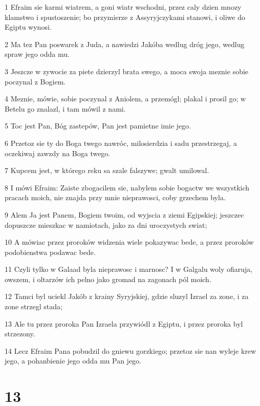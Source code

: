 \par 1 Efraim sie karmi wiatrem, a goni wiatr wschodni, przez caly dzien mnozy klamstwo i spustoszenie; bo przymierze z Assyryjczykami stanowi, i oliwe do Egiptu wynosi.
\par 2 Ma tez Pan poswarek z Juda, a nawiedzi Jakóba wedlug dróg jego, wedlug spraw jego odda mu.
\par 3 Jeszcze w zywocie za piete dzierzyl brata swego, a moca swoja meznie sobie poczynal z Bogiem.
\par 4 Meznie, mówie, sobie poczynal z Aniolem, a przemógl; plakal i prosil go; w Betelu go znalazl, i tam mówil z nami.
\par 5 Toc jest Pan, Bóg zastepów, Pan jest pamietne imie jego.
\par 6 Przetoz sie ty do Boga twego nawróc, milosierdzia i sadu przestrzegaj, a oczekiwaj zawzdy na Boga twego.
\par 7 Kupcem jest, w którego reku sa szale falszywe; gwalt umilowal.
\par 8 I mówi Efraim: Zaiste zbogacilem sie, nabylem sobie bogactw we wszystkich pracach moich, nie znajda przy mnie nieprawosci, coby grzechem byla.
\par 9 Alem Ja jest Panem, Bogiem twoim, od wyjscia z ziemi Egipskiej; jeszczec dopuszcze mieszkac w namiotach, jako za dni uroczystych swiat;
\par 10 A mówiac przez proroków widzenia wiele pokazywac bede, a przez proroków podobienstwa podawac bede.
\par 11 Czyli tylko w Galaad byla nieprawosc i marnosc? I w Galgalu woly ofiaruja, owszem, i oltarzów ich pelno jako gromad na zagonach pól moich.
\par 12 Tamci byl uciekl Jakób z krainy Syryjskiej, gdzie sluzyl Izrael za zone, i za zone strzegl stada;
\par 13 Ale tu przez proroka Pan Izraela przywiódl z Egiptu, i przez proroka byl strzezony.
\par 14 Lecz Efraim Pana pobudzil do gniewu gorzkiego; przetoz sie nan wyleje krew jego, a pohanbienie jego odda mu Pan jego.

\chapter{13}

